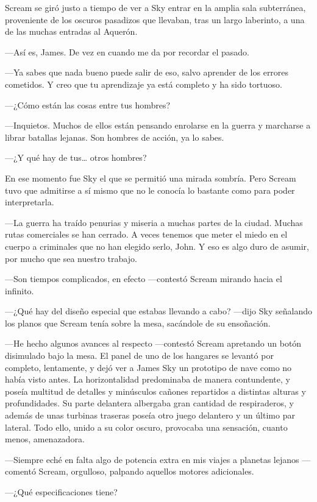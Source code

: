 Scream se giró justo a tiempo de ver a Sky entrar en la amplia sala subterránea, proveniente de los oscuros pasadizos que llevaban, tras un largo laberinto, a una de las muchas entradas al Aquerón.

---Así es, James. De vez en cuando me da por recordar el pasado.

---Ya sabes que nada bueno puede salir de eso, salvo aprender de los errores cometidos. Y creo que tu aprendizaje ya está completo y ha sido tortuoso.

---¿Cómo están las cosas entre tus hombres?

---Inquietos. Muchos de ellos están pensando enrolarse en la guerra y marcharse a librar batallas lejanas. Son hombres de acción, ya lo sabes.

---¿Y qué hay de tus\dots{} otros hombres?

En ese momento fue Sky el que se permitió una mirada sombría. Pero Scream tuvo que admitirse a sí mismo que no le conocía lo bastante como para poder interpretarla.

---La guerra ha traído penurias y miseria a muchas partes de la ciudad. Muchas rutas comerciales se han cerrado. A veces tenemos que meter el miedo en el cuerpo a criminales que no han elegido serlo, John. Y eso es algo duro de asumir, por mucho que sea nuestro trabajo.

---Son tiempos complicados, en efecto ---contestó Scream mirando hacia el infinito.

---¿Qué hay del diseño especial que estabas llevando a cabo? ---dijo Sky señalando los planos que Scream tenía sobre la mesa, sacándole de su ensoñación.

---He hecho algunos avances al respecto ---contestó Scream apretando un botón disimulado bajo la mesa. El panel de uno de los hangares se levantó por completo, lentamente, y dejó ver a James Sky un prototipo de nave como no había visto antes. La horizontalidad predominaba de manera contundente, y poseía multitud de detalles y minúsculos cañones repartidos a distintas alturas y profundidades. Su parte delantera albergaba gran cantidad de respiraderos, y además de unas turbinas traseras poseía otro juego delantero y un último par lateral. Todo ello, unido a su color oscuro, provocaba una sensación, cuanto menos, amenazadora.

---Siempre eché en falta algo de potencia extra en mis viajes a planetas lejanos ---comentó Scream, orgulloso, palpando aquellos motores adicionales.

---¿Qué especificaciones tiene?

